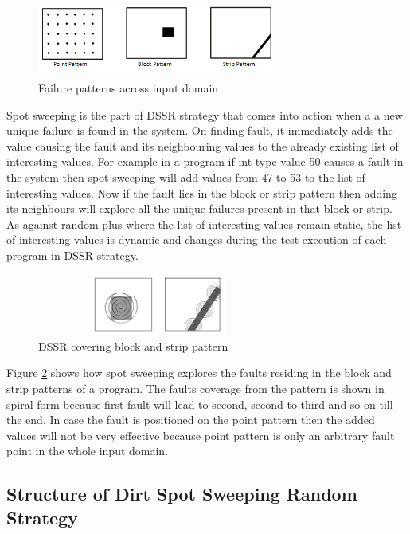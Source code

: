 \documentclass[conference]{IEEEtran}
\begin{document}
\begin{figure}[ht]                                    
\centering
\includegraphics[width= 8cm,height=2.5cm]{ART_Patterns.png}
\caption{Failure patterns across input domain \cite{Chen2008}}
\label{fig:patterns}
\end{figure}

Spot sweeping is the part of DSSR strategy that comes into action when a a new unique failure is found in the system. On finding fault, it immediately adds the value causing the fault and its neighbouring values to the already existing list of interesting values. For example in a program if int type value 50 causes a fault in the system then spot sweeping will add values from 47 to 53 to the list of interesting values. Now if the fault lies in the block or strip pattern then adding its neighbours will explore all the unique failures present in that block or strip. As against random plus where the list of interesting values remain static, the list of interesting values is dynamic and changes during the test execution of each program in DSSR strategy.

\begin{figure}[ht]
\centering
\includegraphics[width=8cm,height=2cm]{block2.png}
\caption{DSSR covering block and strip pattern}
\label{fig:block2}
\end{figure}

Figure \ref{fig:block2} shows how spot sweeping explores the faults residing in the block and strip patterns of a program. The faults coverage from the pattern is shown in spiral form because first fault will lead to second, second to third and so on till the end. In case the fault is positioned on the point pattern then the added values will not be very effective because point pattern is only an arbitrary fault point in the whole input domain.

\subsection{Structure of Dirt Spot Sweeping Random Strategy}
\end{document}
